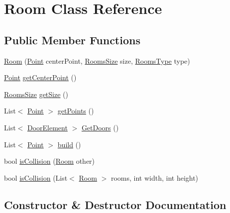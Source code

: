 \hypertarget{class_room}{}\section{Room Class Reference}
\label{class_room}
\subsection*{Public Member Functions}
\begin{DoxyCompactItemize}
\item 
\mbox{\hyperlink{class_room_ac04065fa5b21e7426dd84396319f9c65}{Room}} (\mbox{\hyperlink{class_point}{Point}} center\+Point, \mbox{\hyperlink{_rooms_enum_8cs_a7eb4c91eb68aa4d08f6f9afb7f9d36ed}{Rooms\+Size}} size, \mbox{\hyperlink{_rooms_enum_8cs_af355bc855a8786ab3e2c551d0f786ae1}{Rooms\+Type}} type)
\item 
\mbox{\hyperlink{class_point}{Point}} \mbox{\hyperlink{class_room_af810d97e62205a361909549d2bc797c8}{get\+Center\+Point}} ()
\item 
\mbox{\hyperlink{_rooms_enum_8cs_a7eb4c91eb68aa4d08f6f9afb7f9d36ed}{Rooms\+Size}} \mbox{\hyperlink{class_room_a7c1dafb422b0f3e1673c7b94beb97c68}{get\+Size}} ()
\item 
List$<$ \mbox{\hyperlink{class_point}{Point}} $>$ \mbox{\hyperlink{class_room_a8536918397f63ca1101ac0502f284ba4}{get\+Points}} ()
\item 
List$<$ \mbox{\hyperlink{class_door_element}{Door\+Element}} $>$ \mbox{\hyperlink{class_room_a90b8e2622989c944fa5741cf49f1570a}{Get\+Doors}} ()
\item 
List$<$ \mbox{\hyperlink{class_point}{Point}} $>$ \mbox{\hyperlink{class_room_a5f84f542feea82f8a0db07bb2edfc487}{build}} ()
\item 
bool \mbox{\hyperlink{class_room_a8335d4c9d01753a0510bc234c68d6441}{is\+Collision}} (\mbox{\hyperlink{class_room}{Room}} other)
\item 
bool \mbox{\hyperlink{class_room_ab08dbb20c76ccfd5580fc8243fdbedc6}{is\+Collision}} (List$<$ \mbox{\hyperlink{class_room}{Room}} $>$ rooms, int width, int height)
\end{DoxyCompactItemize}


\subsection{Constructor \& Destructor Documentation}
\mbox{\label{class_room_ac04065fa5b21e7426dd84396319f9c65}} 
